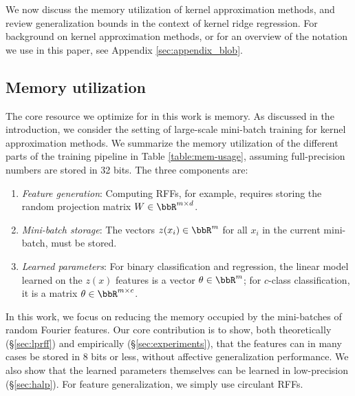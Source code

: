 We now discuss the memory utilization of kernel approximation methods, and review generalization bounds in the context of kernel ridge regression. For background on kernel approximation methods, or for an overview of the notation we use in this paper, see Appendix \ref{sec:appendix_blob}.

\subsection{Memory utilization}
\label{subsec:memory_utils}
The core resource we optimize for in this work is memory.  As discussed in the introduction, we consider the setting of large-scale mini-batch training for kernel approximation methods. We summarize the memory utilization of the different parts of the training pipeline in Table \ref{table:mem-usage}, assuming full-precision numbers are stored in 32 bits. The three components are:
\begin{enumerate}
	\item \textit{Feature generation}: Computing RFFs, for example, requires storing the random projection matrix $W \in \RR^{m\times d}$.
	\item \textit{Mini-batch storage}: The vectors $z(x_i)\in\RR^m$ for all $x_i$ in the current mini-batch, must be stored.
	\item \textit{Learned parameters}: For binary classification and regression, the linear model learned on the $z(x)$ features is a vector $\theta \in \RR^m$; for $c$-class classification, it is a matrix $\theta \in \RR^{m\times c}$.	
\end{enumerate}

In this work, we focus on reducing the memory occupied by the mini-batches of random Fourier features. Our core contribution is to show, both theoretically (\S\ref{sec:lprff}) and empirically (\S\ref{sec:experiments}), that the features can in many cases be stored in 8 bits or less, without affective generalization performance.  We also show that the learned parameters themselves can be learned in low-precision (\S\ref{sec:halp}).  For feature generalization, we simply use circulant RFFs\cite{yu15}.

